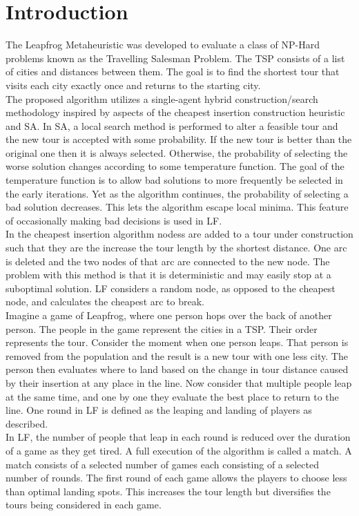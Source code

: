 \documentclass[12pt,letterpaper,oneside]{book}
\begin{document}
\chapter{Introduction}
The Leapfrog Metaheuristic was developed to evaluate a class of NP-Hard problems known as the Travelling Salesman Problem. The TSP consists of a list of cities and distances between them. The goal is to find the shortest tour that visits each city exactly once and returns to the starting city.\\ 
The proposed algorithm utilizes a single-agent hybrid construction/search methodology inspired by aspects of the cheapest insertion construction heuristic and SA. In SA, a local search method is performed to alter a feasible tour and the new tour is accepted with some probability. If the new tour is better than the original one then it is always selected. Otherwise, the probability of selecting the worse solution changes according to some temperature function. The goal of the temperature function is to allow bad solutions to more frequently be selected in the early iterations. Yet as the algorithm continues, the probability of selecting a bad solution decreases. This lets the algorithm escape local minima. This feature of occasionally making bad decisions is used in LF.\\
In the cheapest insertion algorithm nodess are added to a tour under construction such that they are the increase the tour length by the shortest distance. One arc is deleted and the two nodes of that arc are connected to the new node. The problem with this method is that it is deterministic and may easily stop at a suboptimal solution. LF considers a random node, as opposed to the cheapest node, and calculates the cheapest arc to break.\\
Imagine a game of Leapfrog, where one person hops over the back of another person. The people in the game represent the cities in a TSP. Their order represents the tour. Consider the moment when one person leaps. That person is removed from the population and the result is a new tour with one less city. The person then evaluates where to land based on the change in tour distance caused by their insertion at any place in the line. Now consider that multiple people leap at the same time, and one by one they evaluate the best place to return to the line. One round in LF is defined as the leaping and landing of players as described.\\
In LF, the number of people that leap in each round is reduced over the duration of a game as they get tired. A full execution of the algorithm is called a match. A match consists of a selected number of games each consisting of a selected number of rounds. The first round of each game allows the players to choose less than optimal landing spots. This increases the tour length but diversifies the tours being considered in each game.
\end{document}
